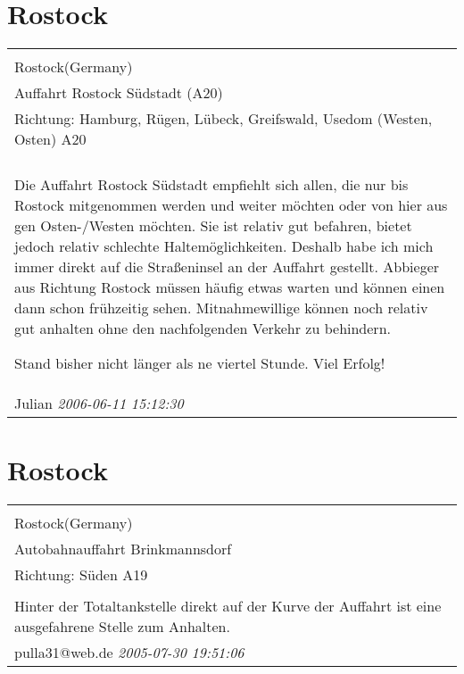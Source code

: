 \documentclass[a4paper,12pt]{article}
\begin{document}
\section{Rostock}
\begin{tabular}{|p{13cm}|}
\hline\\
Rostock(Germany)\\
Auffahrt Rostock Südstadt (A20)\\
Richtung: Hamburg, Rügen, Lübeck, Greifswald, Usedom (Westen, Osten) A20 \\
\hline\\
Die Auffahrt Rostock Südstadt empfiehlt sich allen, die nur bis Rostock mitgenommen werden und weiter möchten oder von hier aus gen Osten-/Westen möchten. Sie ist relativ gut befahren, bietet jedoch relativ schlechte Haltemöglichkeiten. Deshalb habe ich mich immer direkt auf die Straßeninsel an der Auffahrt gestellt. Abbieger aus Richtung Rostock müssen häufig etwas warten und können einen dann schon frühzeitig sehen. Mitnahmewillige können noch relativ gut anhalten ohne den nachfolgenden Verkehr zu behindern.

Stand bisher nicht länger als ne viertel Stunde. Viel Erfolg! \\
Julian \textit{ 2006-06-11 15:12:30 }\\\hline
\end{tabular}


\section{Rostock}
\begin{tabular}{|p{13cm}|}
\hline\\
Rostock(Germany)\\
Autobahnauffahrt Brinkmannsdorf\\
Richtung: Süden A19 \\
\hline\\
Hinter der Totaltankstelle direkt auf der Kurve der Auffahrt ist eine ausgefahrene Stelle zum Anhalten. \\
pulla31@web.de \textit{ 2005-07-30 19:51:06 }\\\hline
\end{tabular}
\end{document}

